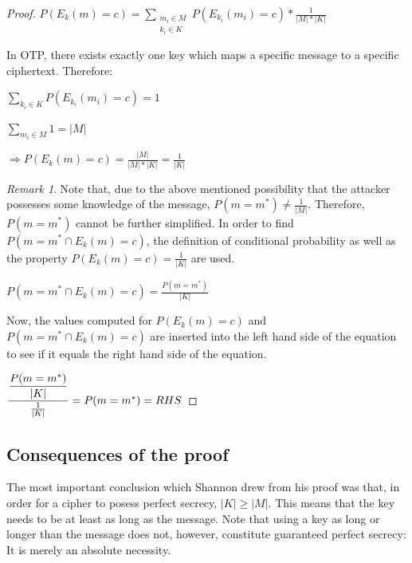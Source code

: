 \documentclass[12pt]{report}
\theoremstyle{definition}
\theoremstyle{remark}
\newtheorem{rem}[thm]{Remark}
\begin{document}
\begin{proof}
$P({E_k}(m)=c) = \sum\limits_{\substack{m_i \in M \\ k_i \in K}}
P(E_{k_i}(m_i)=c) 
* \frac{1}{\lvert M \rvert*\lvert K \rvert}$

In OTP, there exists exactly one key which maps a specific message to a specific ciphertext. Therefore:

$\sum\limits_{k_i \in K}
P(E_{k_i}(m_i)=c)
=1$

$\sum\limits_{m_i \in M} 1
= \lvert M \rvert$

$\Rightarrow P({E_k}(m)=c) = \frac{\lvert M \rvert}{\lvert M \rvert*\lvert K \rvert} = \frac{1}{\lvert K \rvert}$

\begin{rem}
Note that, due to the above mentioned possibility that the attacker possesses some knowledge of the message, $P(m=m^{*}) \neq \frac{1}{\lvert M \rvert}$. Therefore, $P(m=m^{*})$ cannot be further simplified. In order to find $P(m=m^{*} \cap {E_k}(m)=c)$, the definition of conditional probability as well as the property $P({E_k}(m)=c) = \frac{1}{\lvert K \rvert}$ are used.
\end{rem}

$P(m=m^{*} \cap {E_k}(m)=c) = \frac{P(m=m^{*})}{\lvert K \rvert}$

Now, the values computed for $P({E_k}(m)=c)$ and $P(m=m^{*} \cap {E_k}(m)=c)$ are inserted into the left hand side of the equation to see if it equals the right hand side of the equation.

$\dfrac{\dfrac{P(m=m^{*})}{\lvert K \rvert}}{\frac{1}{\lvert K \rvert}} = P(m=m^{*}) \\
= RHS$
\end{proof}

\subsection{Consequences of the proof}


The most important conclusion which Shannon drew from his proof was that, in order for a cipher to posess perfect secrecy, $\lvert K \rvert \geqslant \lvert M \rvert$\cite{ShannonOTP}. This means that the key needs to be at least as long as the message. Note that using a key as long or longer than the message does not, however, constitute guaranteed perfect secrecy: It is merely an absolute necessity.
\end{document}
